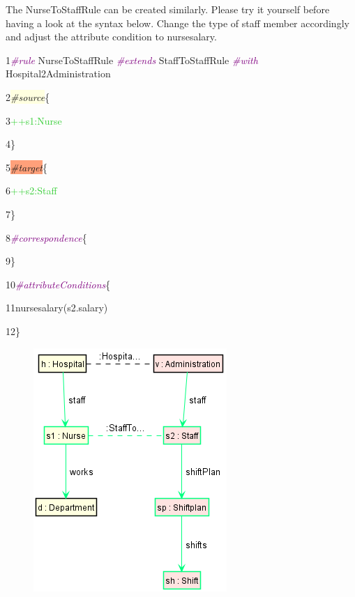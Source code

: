 \clearpage

The \textsf{NurseToStaffRule} can be created similarly. Please try it yourself before having a look at the syntax below. Change the type of staff member accordingly and adjust the attribute condition to \textsf{nursesalary}.\newline

{

1\hspace{0.5cm}\textcolor{Purple}{\textit{\#rule}} NurseToStaffRule \textcolor{Purple}{\textit{\#extends}} StaffToStaffRule \textcolor{Purple}{\textit{\#with}} Hospital2Administration

2\hspace{0.5cm}\colorbox{LightYellow}{\textit{\#source}}\{

3\hspace{1cm}\textcolor{LimeGreen}{++s1:Nurse}

4\hspace{0.5cm}\}

5\hspace{0.5cm}\colorbox{LightSalmon}{\textit{\#target}}\{

6\hspace{1cm}\textcolor{LimeGreen}{++s2:Staff}

7\hspace{0.5cm}\}

8\hspace{0.5cm}\textcolor{Purple}{\textit{\#correspondence}}\{

9\hspace{0.5cm}\}

10\hspace{0.42cm}\textcolor{Purple}{\textit{\#attributeConditions}}\{

11\hspace{1cm}nursesalary(s2.salary)

12\hspace{0.5cm}\}\newline

}

\begin{figure}[h]
    \centering
    \includegraphics[scale=0.65 ]{pictures/NurseToStaffRule.png}
    \caption{}
    \label{NurseToStaffRule}
\end{figure}

